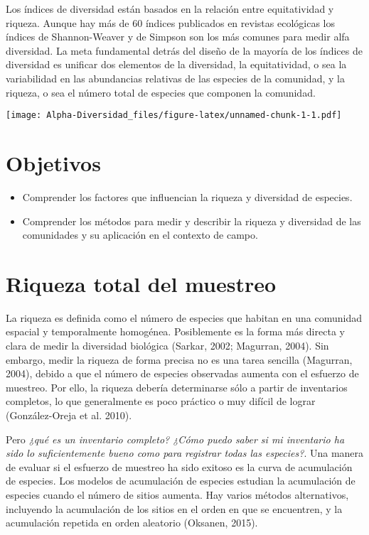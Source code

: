 \documentclass[]{book}
\providecommand{\tightlist}{%
  \setlength{\itemsep}{0pt}\setlength{\parskip}{0pt}}
\begin{document}
Los índices de diversidad están basados en la relación entre
equitatividad y riqueza. Aunque hay más de 60 índices publicados en
revistas ecológicas los índices de Shannon-Weaver y de Simpson son los
más comunes para medir alfa diversidad. La meta fundamental detrás del
diseño de la mayoría de los índices de diversidad es unificar dos
elementos de la diversidad, la equitatividad, o sea la variabilidad en
las abundancias relativas de las especies de la comunidad, y la riqueza,
o sea el número total de especies que componen la comunidad.

\texttt{[image: Alpha-Diversidad\_files/figure-latex/unnamed-chunk-1-1.pdf]}

\chapter{Objetivos}\label{objetivos}

\begin{itemize}
\tightlist
\item
  Comprender los factores que influencian la riqueza y diversidad de
  especies.
\end{itemize}

\begin{itemize}
\tightlist
\item
  Comprender los métodos para medir y describir la riqueza y diversidad
  de las comunidades y su aplicación en el contexto de campo.
\end{itemize}

\chapter{Riqueza total del muestreo}\label{riqueza-total-del-muestreo}

La riqueza es definida como el número de especies que habitan en una
comunidad espacial y temporalmente homogénea. Posiblemente es la forma
más directa y clara de medir la diversidad biológica (Sarkar, 2002;
Magurran, 2004). Sin embargo, medir la riqueza de forma precisa no es
una tarea sencilla (Magurran, 2004), debido a que el número de especies
observadas aumenta con el esfuerzo de muestreo. Por ello, la riqueza
debería determinarse sólo a partir de inventarios completos, lo que
generalmente es poco práctico o muy difícil de lograr (González-Oreja et
al. 2010).

Pero \emph{¿qué es un inventario completo? ¿Cómo puedo saber si mi
inventario ha sido lo suficientemente bueno como para registrar todas
las especies?}. Una manera de evaluar si el esfuerzo de muestreo ha sido
exitoso es la curva de acumulación de especies. Los modelos de
acumulación de especies estudian la acumulación de especies cuando el
número de sitios aumenta. Hay varios métodos alternativos, incluyendo la
acumulación de los sitios en el orden en que se encuentren, y la
acumulación repetida en orden aleatorio (Oksanen, 2015).
\end{document}
